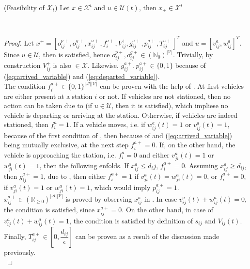 \begin{proposition}{(Feasibility of $\mathcal{X}_t$)}\label{appendix:pro:feas_x}
	Let $x \in \mathcal{X}^t$ and $u \in \mathcal{U}(t)$, then $x_+ \in \mathcal{X}^t$
\end{proposition}\\
\begin{proof}
Let $x^+ = [o_{ij}^{p+}, o_{ij}^{g+}, x_{ij}^{a+}, f^{a+}_{i}, V_{ij}^{+}, g^{a+}_{ij}, p^{a+}_{ij}, T^{a+}_{ij}]^T$ and $u = [v^{a}_{ij}, w^{a}_{ij}]^T$. Since $u \in \mathcal{U}$, then  is satisfied, hence $o_{ij}^{p+}, o_{ij}^{g+} \in (\mathbb{N}_0)^{|\mathcal{V}|}$. Trivially, by construction $V_{ij}^{+}$ is also $\in \mathcal{X}$. Likewise, $g^{a+}_{ij}, p^{a+}_{ij} \in \{0,1\}$ because of (\ref{eq:arrived_variable}) and (\ref{eq:departed_variable}). \\
The condition $f^{a+}_{i} \in \{0,1\}^{|\mathcal{A}||\mathcal{V}|}$ can be proven with the help of . At first vehicles are either present at a station $i$ or not. If vehicles are not stationed, then no action can be taken due to  (if $u \in \mathcal{U}$, then it is satisfied), which impliese no vehicle is departing or arriving at the station. Otherwise, if vehicles are indeed stationed, then $f^{a}_{i} = 1$. If a vehicle moves, i.e. if $w^a_{ij}(t) = 1$ or $v^a_{ij}(t) = 1$, because of the first condition of , then because of  and (\ref{eq:arrived_variable}) being mutually exclusive, at the next step $f^{a+}_{i} =0$. If, on the other hand, the vehicle is approaching the station, i.e. $f^{a}_{i} =0$ and 
either $v^a_{ji}(t) = 1$ or $w^a_{ji}(t) = 1$, then the following enfolds. If $x_{ij}^{a} \leq d_ij$, $f^{a+}_{i} =0$. Assuming $x_{ij}^{a} \ge d_{ij}$, then $g^{a+}_{ij} = 1$, due to , then either $f^{a+}_{i} =1$ if  $v^a_{ji}(t) = w^a_{ji}(t) = 0$, or $f^{a+}_{i} =0$, if $v^a_{ji}(t) = 1$ or $w^a_{ji}(t) = 1$, which would imply $p^{a+}_{ij}=1$. \\
$x_{ij}^{a+}\in (\mathbb{R}_{\ge 0})^{|\mathcal{A}||\mathcal{V}|}$ is proved by observing $x_{ij}^a$ in  . In case $v^a_{ij}(t) + w^a_{ij}(t)= 0$, the condition is satisfied, since  $x_{ij}^{a+} = 0$.  On the other hand, in case of $v^a_{ij}(t) + w^a_{ij}(t)= 1$, the condition is satisfied by definition of $s_{ij}$ and $V_{ij}(t)$. \\
Finally, $T_{ij}^{a+} \in [0, \dfrac{d_{ij}}{\epsilon}]$ can be proven as a result of the discussion made previously. \\

\end{proof}
